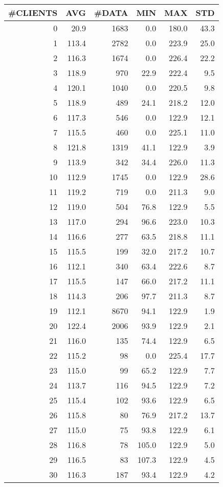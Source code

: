 \begin{tabular}{|r|r|r|r|r|r|}
\hline
 \#CLIENTS & AVG & \#DATA & MIN & MAX & STD\\
\hline
0 &  20.9 & 1683 & 0.0 & 180.0 & 43.3\\
1 &  113.4 & 2782 & 0.0 & 223.9 & 25.0\\
2 &  116.3 & 1674 & 0.0 & 226.4 & 22.2\\
3 &  118.9 & 970 & 22.9 & 222.4 & 9.5\\
4 &  120.1 & 1040 & 0.0 & 220.5 & 9.8\\
5 &  118.9 & 489 & 24.1 & 218.2 & 12.0\\
6 &  117.3 & 546 & 0.0 & 122.9 & 12.1\\
7 &  115.5 & 460 & 0.0 & 225.1 & 11.0\\
8 &  121.8 & 1319 & 41.1 & 122.9 & 3.9\\
9 &  113.9 & 342 & 34.4 & 226.0 & 11.3\\
10 &  112.9 & 1745 & 0.0 & 122.9 & 28.6\\
11 &  119.2 & 719 & 0.0 & 211.3 & 9.0\\
12 &  119.0 & 504 & 76.8 & 122.9 & 5.5\\
13 &  117.0 & 294 & 96.6 & 223.0 & 10.3\\
14 &  116.6 & 277 & 63.5 & 218.8 & 11.1\\
15 &  115.5 & 199 & 32.0 & 217.2 & 10.7\\
16 &  112.1 & 340 & 63.4 & 222.6 & 8.7\\
17 &  115.5 & 147 & 66.0 & 217.2 & 11.1\\
18 &  114.3 & 206 & 97.7 & 211.3 & 8.7\\
19 &  112.1 & 8670 & 94.1 & 122.9 & 1.9\\
20 &  122.4 & 2006 & 93.9 & 122.9 & 2.1\\
21 &  116.0 & 135 & 74.4 & 122.9 & 6.5\\
22 &  115.2 & 98 & 0.0 & 225.4 & 17.7\\
23 &  115.0 & 99 & 65.2 & 122.9 & 7.7\\
24 &  113.7 & 116 & 94.5 & 122.9 & 7.2\\
25 &  115.4 & 102 & 93.6 & 122.9 & 6.5\\
26 &  115.8 & 80 & 76.9 & 217.2 & 13.7\\
27 &  115.0 & 75 & 93.8 & 122.9 & 6.1\\
28 &  116.8 & 78 & 105.0 & 122.9 & 5.0\\
29 &  116.5 & 83 & 107.3 & 122.9 & 4.5\\
30 &  116.3 & 187 & 93.4 & 122.9 & 4.2\\

\end{tabular}
